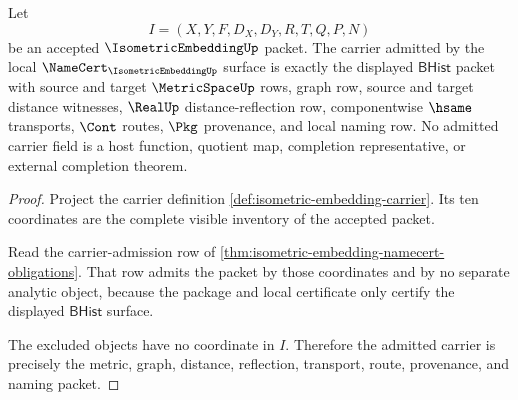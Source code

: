 \begin{theorem}
\label{thm:isometric-embedding-carrier-admission}
Let
$$
I=(X,Y,F,D_X,D_Y,R,T,Q,P,N)
$$
be an accepted $\IsometricEmbeddingUp$ packet. The carrier admitted by the local $\NameCert_{\IsometricEmbeddingUp}$ surface is exactly the displayed $\mathsf{BHist}$ packet with source and target $\MetricSpaceUp$ rows, graph row, source and target distance witnesses, $\RealUp$ distance-reflection row, componentwise $\hsame$ transports, $\Cont$ routes, $\Pkg$ provenance, and local naming row. No admitted carrier field is a host function, quotient map, completion representative, or external completion theorem.
\end{theorem}
\begin{proof}
Project the carrier definition \autoref{def:isometric-embedding-carrier}. Its ten coordinates are the complete visible inventory of the accepted packet.

Read the carrier-admission row of \autoref{thm:isometric-embedding-namecert-obligations}. That row admits the packet by those coordinates and by no separate analytic object, because the package and local certificate only certify the displayed $\mathsf{BHist}$ surface.

The excluded objects have no coordinate in $I$. Therefore the admitted carrier is precisely the metric, graph, distance, reflection, transport, route, provenance, and naming packet.
\end{proof}

